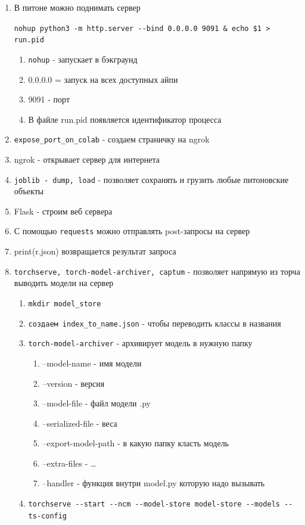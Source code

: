 \documentclass[a4paper, 12pt]{article}
\begin{document}
\begin{enumerate}
  \item В питоне можно поднимать сервер 
  
    \verb+nohup python3 -m http.server --bind 0.0.0.0 9091 & echo $1 > run.pid+
  \begin{enumerate}
    \item \verb+nohup+ - запускает в бэкграунд
    \item 0.0.0.0 = запуск на всех доступных айпи
    \item 9091 - порт
    \item В файле run.pid появляется идентификатор процесса    
  \end{enumerate}
  \item \verb+expose_port_on_colab+ - создаем страничку на ngrok
  \item ngrok - открывает сервер для интернета
  \item \verb+joblib - dump, load+ - позволяет сохранять и грузить любые питоновские объекты
  \item Flask - строим веб сервера
  \item С помощью \verb+requests+ можно отправлять post-запросы на сервер
  \item print(r.json) возвращается результат запроса
  \item \verb+torchserve, torch-model-archiver, captum+ - позволяет напрямую из торча выводить модели на сервер
  \begin{enumerate}
    \item \verb+mkdir model_store+
    \item \verb+создаем index_to_name.json+ - чтобы переводить классы в названия
    \item \verb+torch-model-archiver+ - архивирует модель в нужную папку
    \begin{enumerate}
      \item --model-name - имя модели
      \item --version - версия
      \item --model-file - файл модели .py
      \item --serialized-file - веса 
      \item --export-model-path - в какую папку класть модель
      \item --extra-files - \dots
      \item --handler - функция внутри model.py которую надо вызывать
    \end{enumerate}
    \item \verb+torchserve --start --ncm --model-store model-store --models --ts-config+

\end{enumerate}
\end{enumerate}
\end{document}
